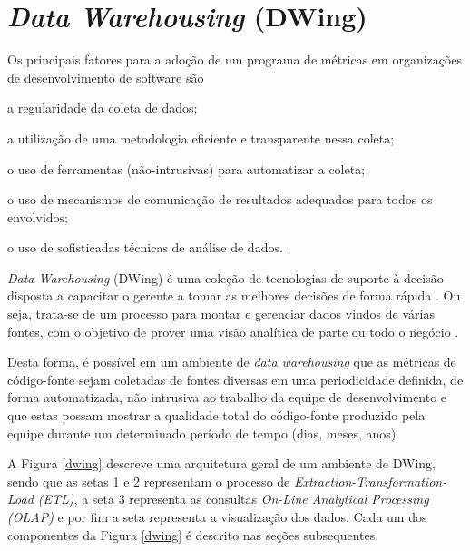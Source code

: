 \chapter{\textit{Data Warehousing} (DWing)} 

Os principais fatores para a adoção de um programa de métricas em 
organizações de desenvolvimento de software são\begin{inparaenum}[i)]
\item a regularidade da coleta de dados;
\item a utilização de uma metodologia eficiente e transparente nessa coleta; 
\item o uso de ferramentas (não-intrusivas) para automatizar a coleta; 
\item o uso de mecanismos de comunicação de resultados adequados para todos os envolvidos; 
\item o uso de sofisticadas técnicas de análise de dados. 
.
\end{inparaenum} 


\textit{Data Warehousing} (DWing) é uma coleção de tecnologias de suporte à decisão disposta a capacitar o gerente a tomar as melhores decisões de forma rápida . Ou seja, trata-se de um processo para montar e gerenciar dados vindos de várias fontes, com o objetivo de prover uma visão analítica de parte ou todo o negócio \cite{gardner1998}.

Desta forma, é possível em um ambiente de \textit{data warehousing} que as métricas de código-fonte sejam coletadas de fontes diversas em uma periodicidade definida, de forma automatizada, não intrusiva ao trabalho da equipe de desenvolvimento e que estas possam mostrar a qualidade total do código-fonte produzido pela equipe durante um determinado período de tempo (dias, meses, anos). 


A Figura \ref{dwing} descreve uma arquitetura geral de um ambiente de DWing, sendo que as setas 1 e 2 representam o processo de \textit{Extraction-Transformation-Load (ETL)}, a seta 3 representa as consultas \textit{On-Line Analytical Processing (OLAP)} e por fim a seta representa a visualização dos dados. Cada um dos componentes da Figura \ref{dwing} é descrito nas seções subsequentes.

